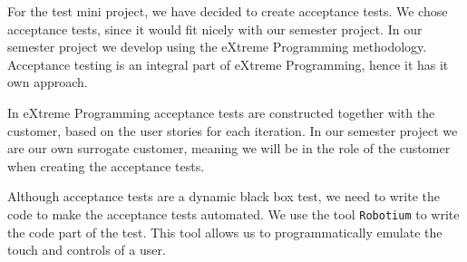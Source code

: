 For the test mini project, we have decided to create acceptance tests.
We chose acceptance tests, since it would fit nicely with our semester project.
In our semester project we develop using the eXtreme Programming methodology.
Acceptance testing is an integral part of eXtreme Programming, hence it has it own approach.

In eXtreme Programming acceptance tests are constructed together with the customer, based on the user stories for each iteration.
In our semester project we are our own surrogate customer, meaning we will be in the role of the customer when creating the acceptance tests.

Although acceptance tests are a dynamic black box test, we need to write the code to make the acceptance tests automated.
We use the tool \texttt{Robotium} to write the code part of the test. 
This tool allows us to programmatically emulate the touch and controls of a user.